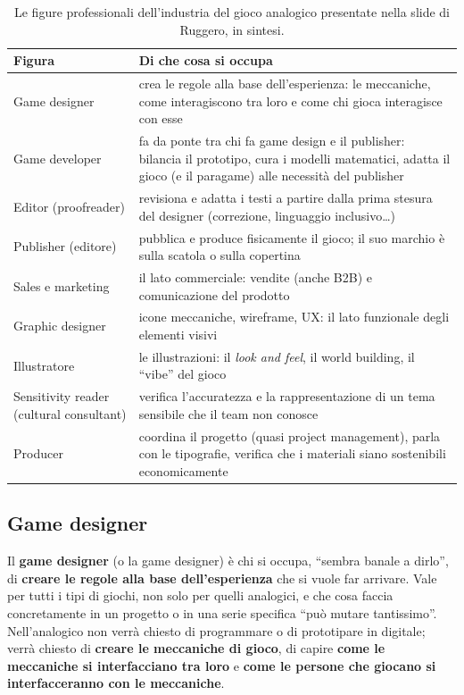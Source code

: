 \begin{table}[htbp]
\centering
\small
\begin{tabular}{@{}p{3.3cm}p{9.6cm}@{}}
\toprule
\textbf{Figura} & \textbf{Di che cosa si occupa} \\
\midrule
Game designer & crea le regole alla base dell'esperienza: le meccaniche, come
interagiscono tra loro e come chi gioca interagisce con esse \\
Game developer & fa da ponte tra chi fa game design e il publisher: bilancia il
prototipo, cura i modelli matematici, adatta il gioco (e il paragame) alle
necessità del publisher \\
Editor (proofreader) & revisiona e adatta i testi a partire dalla prima stesura
del designer (correzione, linguaggio inclusivo\ldots) \\
Publisher (editore) & pubblica e produce fisicamente il gioco; il suo marchio è
sulla scatola o sulla copertina \\
Sales e marketing & il lato commerciale: vendite (anche B2B) e comunicazione del
prodotto \\
Graphic designer & icone meccaniche, wireframe, UX: il lato funzionale degli
elementi visivi \\
Illustratore & le illustrazioni: il \emph{look and feel}, il world building, il
``vibe'' del gioco \\
Sensitivity reader (cultural consultant) & verifica l'accuratezza e la
rappresentazione di un tema sensibile che il team non conosce \\
Producer & coordina il progetto (quasi project management), parla con le
tipografie, verifica che i materiali siano sostenibili economicamente \\
\bottomrule
\end{tabular}
\caption{Le figure professionali dell'industria del gioco analogico presentate
nella slide di Ruggero, in sintesi.}
\label{a1:tab:figure}
\end{table}

\subsection{Game designer}

Il \textbf{game designer} (o la game designer) è chi si occupa, ``sembra banale
a dirlo'', di \textbf{creare le regole alla base dell'esperienza} che si vuole
far arrivare. Vale per tutti i tipi di giochi, non solo per quelli analogici, e
che cosa faccia concretamente in un progetto o in una serie specifica ``può
mutare tantissimo''. Nell'analogico non verrà chiesto di programmare o di
prototipare in digitale; verrà chiesto di \textbf{creare le meccaniche di
gioco}, di capire \textbf{come le meccaniche si interfacciano tra loro} e
\textbf{come le persone che giocano si interfacceranno con le meccaniche}.

